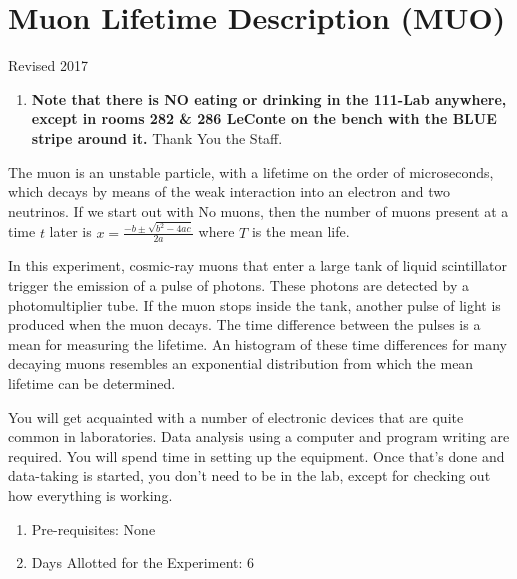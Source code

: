 \documentclass{../lab}
\begin{document}
\maketitle

\tableofcontents

\section{Muon Lifetime Description (MUO)}

Revised 2017

\begin{enumerate}
    \item \textbf{Note that there is NO eating or drinking in the 111-Lab anywhere, except in rooms 282 \& 286 LeConte on the bench with the BLUE stripe around it.} Thank You the Staff.

\end{enumerate}

The muon is an unstable particle, with a lifetime on the order of microseconds, which decays by means of the weak interaction into an electron and two neutrinos. If we start out with No muons, then the number of muons present at a time $t$ later is $x = \frac{-b \pm \sqrt{b^2-4ac}}{2a}$ where $T$ is the mean life.

In this experiment, cosmic-ray muons that enter a large tank of liquid scintillator trigger the emission of a pulse of photons. These photons are detected by a photomultiplier tube. If the muon stops inside the tank, another pulse of light is produced when the muon decays. The time difference between the pulses is a mean for measuring the lifetime. An histogram of these time differences for many decaying muons resembles an exponential distribution from which the mean lifetime can be determined.

You will get acquainted with a number of electronic devices that are quite common in laboratories. Data analysis using a computer and program writing are required. You will spend time in setting up the equipment. Once that's done and data-taking is started, you don't need to be in the lab, except for checking out how everything is working.

\begin{enumerate}
    \item Pre-requisites: None

    \item Days Allotted for the Experiment: 6
\end{enumerate}
\end{document}
